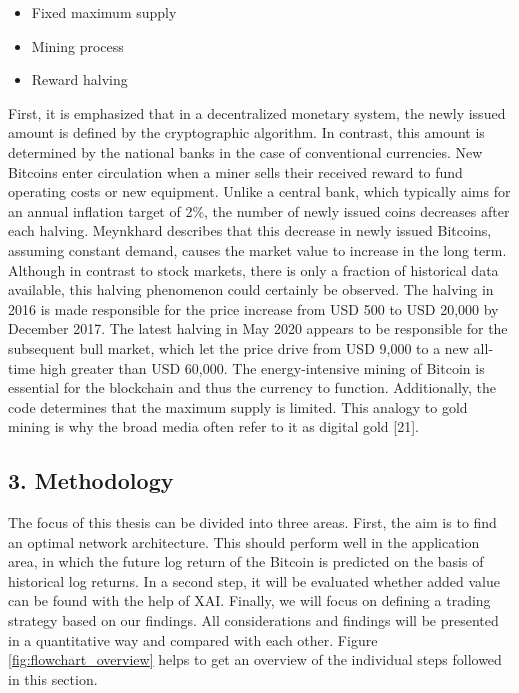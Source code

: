 \documentclass[
]{article}
\providecommand{\tightlist}{%
  \setlength{\itemsep}{0pt}\setlength{\parskip}{0pt}}
\begin{document}
\begin{itemize}
\tightlist
\item
  Fixed maximum supply
\item
  Mining process
\item
  Reward halving
\end{itemize}

First, it is emphasized that in a decentralized monetary system, the
newly issued amount is defined by the cryptographic algorithm. In
contrast, this amount is determined by the national banks in the case of
conventional currencies. New Bitcoins enter circulation when a miner
sells their received reward to fund operating costs or new equipment.
Unlike a central bank, which typically aims for an annual inflation
target of 2\%, the number of newly issued coins decreases after each
halving. Meynkhard describes that this decrease in newly issued
Bitcoins, assuming constant demand, causes the market value to increase
in the long term. Although in contrast to stock markets, there is only a
fraction of historical data available, this halving phenomenon could
certainly be observed. The halving in 2016 is made responsible for the
price increase from USD 500 to USD 20,000 by December 2017. The latest
halving in May 2020 appears to be responsible for the subsequent bull
market, which let the price drive from USD 9,000 to a new all-time high
greater than USD 60,000. The energy-intensive mining of Bitcoin is
essential for the blockchain and thus the currency to function.
Additionally, the code determines that the maximum supply is limited.
This analogy to gold mining is why the broad media often refer to it as
digital gold {[}21{]}.

\newpage

\hypertarget{methodology}{%
\subsection{3. Methodology}\label{methodology}}

The focus of this thesis can be divided into three areas. First, the aim
is to find an optimal network architecture. This should perform well in
the application area, in which the future log return of the Bitcoin is
predicted on the basis of historical log returns. In a second step, it
will be evaluated whether added value can be found with the help of XAI.
Finally, we will focus on defining a trading strategy based on our
findings. All considerations and findings will be presented in a
quantitative way and compared with each other. Figure
\ref{fig:flowchart_overview} helps to get an overview of the individual
steps followed in this section.
\end{document}
